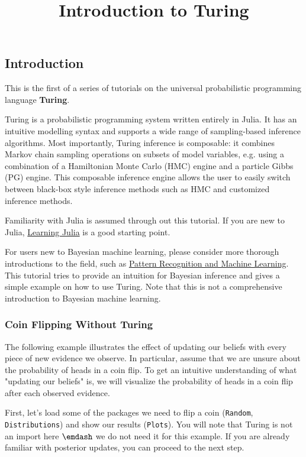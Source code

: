 \documentclass[12pt,a4paper]{article}
\title{ Introduction to Turing }
\begin{document}
\maketitle

\subsection{Introduction}
This is the first of a series of tutorials on the universal probabilistic programming language \textbf{Turing}.

Turing is a probabilistic programming system written entirely in Julia. It has an intuitive modelling syntax and supports a wide range of sampling-based inference algorithms. Most importantly, Turing inference is composable: it combines Markov chain sampling operations on subsets of model variables, e.g. using a combination of a Hamiltonian Monte Carlo (HMC) engine and a particle Gibbs (PG) engine. This composable inference engine allows the user to easily switch between black-box style inference methods such as HMC and customized inference methods.

Familiarity with Julia is assumed through out this tutorial. If you are new to Julia, \href{https://julialang.org/learning/}{Learning Julia} is a good starting point.

For users new to Bayesian machine learning, please consider more thorough introductions to the field, such as \href{https://www.springer.com/us/book/9780387310732}{Pattern Recognition and Machine Learning}. This tutorial tries to provide an intuition for Bayesian inference and gives a simple example on how to use Turing. Note that this is not a comprehensive introduction to Bayesian machine learning.

\subsubsection{Coin Flipping Without Turing}
The following example illustrates the effect of updating our beliefs with every piece of new evidence we observe. In particular, assume that we are unsure about the probability of heads in a coin flip. To get an intuitive understanding of what "updating our beliefs" is, we will visualize the probability of heads in a coin flip after each observed evidence.

First, let's load some of the packages we need to flip a coin (\texttt{Random}, \texttt{Distributions}) and show our results (\texttt{Plots}). You will note that Turing is not an import here \ensuremath{\emdash} we do not need it for this example. If you are already familiar with posterior updates, you can proceed to the next step.
\end{document}
